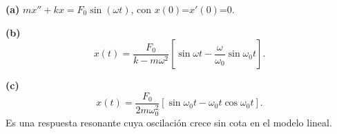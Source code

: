 \noindent\textbf{(a)} \(mx''+kx=F_0\sin(\omega t)\), con \(x(0)\)=\(x'(0)\)=0.

\noindent\textbf{(b)} \[x(t)=\frac{F_0}{k-m\omega^2}\left[\sin\omega t-\frac{\omega}{\omega_0}\sin\omega_0t\right].\]

\noindent\textbf{(c)} \[x(t)=\frac{F_0}{2m\omega_0^2}[\sin\omega_0t-\omega_0t\cos\omega_0t].\]
Es una respuesta resonante cuya oscilación crece sin cota en el modelo lineal.

